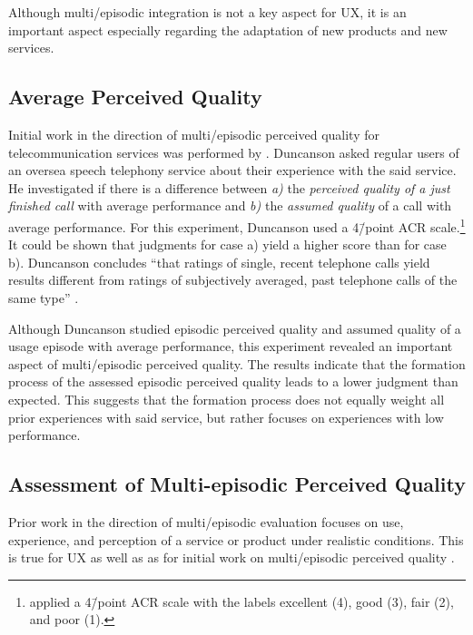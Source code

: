 Although multi\-/episodic integration is not a key aspect for \ac{UX}, it is an important aspect especially regarding the adaptation of new products and new services.

\subsection{Average Perceived Quality \citep{duncanson_average_1969}}
Initial work in the direction of multi\-/episodic perceived quality for telecommunication services was performed by \citet{duncanson_average_1969}.
Duncanson asked regular users of an oversea speech telephony service about their experience with the said service.
He investigated if there is a difference between \emph{a)} the \emph{perceived quality of a just finished call} with average performance and \emph{b)} the \emph{assumed quality} of a call with average performance.
For this experiment, Duncanson used a 4\=/point \ac{ACR} scale.\footnote{\citet{duncanson_average_1969} applied a 4\=/point \ac{ACR} scale with the labels excellent (4), good (3), fair (2), and poor (1).} %
It could be shown that judgments for case a) yield a higher score than for case b).
Duncanson concludes ``that ratings of single, recent telephone calls yield results different from ratings of subjectively averaged, past telephone calls of the same type'' \citep[][p.\,116]{duncanson_average_1969}.

Although Duncanson studied episodic perceived quality and assumed quality of a usage episode with average performance, this experiment revealed an important aspect of multi\-/episodic perceived quality.
The results indicate that the formation process of the assessed episodic perceived quality leads to a lower judgment than expected.
This suggests that the formation process does not equally weight all prior experiences with said service, but rather focuses on experiences with low performance.

\subsection{Assessment of Multi-episodic Perceived Quality}
Prior work in the direction of multi\-/episodic evaluation focuses on use, experience, and perception of a service or product under realistic conditions.
This is true for \ac{UX} as well as as for initial work on multi\-/episodic perceived quality \citep[\ie,][]{moller_single-call_2011}.

